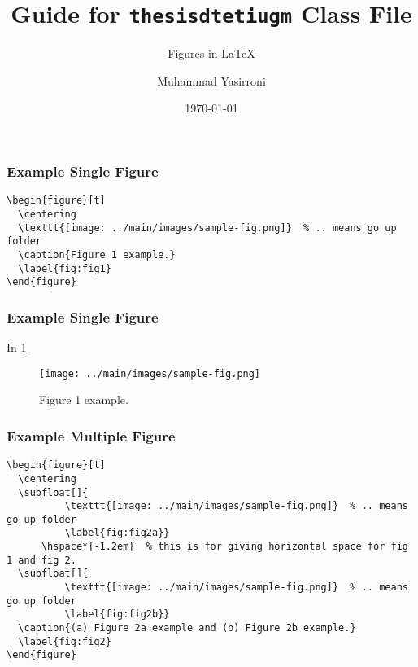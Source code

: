 \documentclass{beamer}
\title{Guide for \texttt{thesisdtetiugm} Class File}
\subtitle{Figures in LaTeX}
\author{Muhammad Yasirroni}
\institute{Universitas Gadjah Mada}
\date{\today}
\begin{document}
\begin{frame}
  \titlepage
\end{frame}

\begin{frame}[fragile]
    \frametitle{Example Single Figure}

\begin{verbatim}
\begin{figure}[t]
  \centering
  \texttt{[image: ../main/images/sample-fig.png]}  % .. means go up folder
  \caption{Figure 1 example.}
  \label{fig:fig1}
\end{figure}
\end{verbatim}

\end{frame}

\begin{frame}[fragile]
    \frametitle{Example Single Figure}

    In \ref{fig:fig1}

    \begin{figure}[t]
      \centering
      \texttt{[image: ../main/images/sample-fig.png]}  %
      \caption{Figure 1 example.}
      \label{fig:fig1}
    \end{figure}

\end{frame}

\begin{frame}[fragile]
    \frametitle{Example Multiple Figure}

\begin{verbatim}
\begin{figure}[t]
  \centering
  \subfloat[]{
          \texttt{[image: ../main/images/sample-fig.png]}  % .. means go up folder
          \label{fig:fig2a}}
      \hspace*{-1.2em}  % this is for giving horizontal space for fig 1 and fig 2.
  \subfloat[]{
          \texttt{[image: ../main/images/sample-fig.png]}  % .. means go up folder
          \label{fig:fig2b}}
  \caption{(a) Figure 2a example and (b) Figure 2b example.}
  \label{fig:fig2}
\end{figure}
\end{verbatim}

\end{frame}
\end{document}

